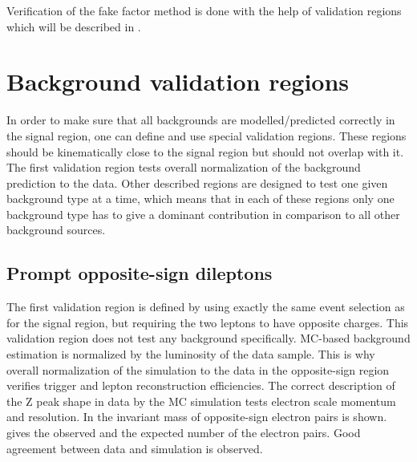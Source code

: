 Verification of the fake factor method is done with the help of validation regions which will be described in .



\section{Background validation regions}
\label{sec:bkg_validation}

In order to make sure that all backgrounds are modelled/predicted correctly in the signal region, one can define and use special validation regions.
These regions should be kinematically close to the signal region but should not overlap with it. 
The first validation region tests overall normalization of the background prediction to the data.
Other described regions are designed to test one given background type at a time,
which means that in each of these regions only one background type has to give a dominant contribution in comparison to all other background sources.

\subsection{Prompt opposite-sign dileptons}

The first validation region is defined by using exactly the same event selection as for the signal region,
but requiring the two leptons to have opposite charges. 
This validation region does not test any background specifically.
MC-based background estimation is normalized by the luminosity of the data sample.
This is why overall normalization of the simulation to the data in the opposite-sign region verifies trigger and lepton reconstruction efficiencies.
The correct description of the Z peak shape in data by the MC simulation tests electron scale momentum and resolution.
In  the invariant mass of opposite-sign electron pairs is shown.
 gives the observed and the expected number of the electron pairs.
Good agreement between data and simulation is observed.

